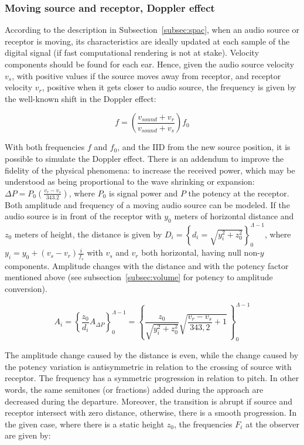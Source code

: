 \subsubsection{Moving source and receptor, Doppler effect}
According to the description in Subsection~\ref{subsec:spac}, when an audio source or receptor is moving, its characteristics are ideally updated at each sample of the digital signal (if fast computational rendering is not at stake). Velocity components should be found for each ear. Hence, given the audio source velocity $v_s$, with positive values if the source moves away from receptor, and receptor velocity $v_r$, positive when it gets closer to audio source, the frequency is given by the well-known shift in the Doppler effect:

\begin{equation}\label{eq:fDoppler}
    f=\left(\frac{v_{sound}+v_r}{v_{sound}+v_s}\right)f_0
\end{equation}

With both frequencies $f$ and $f_0$, and the IID from the new source
position, it is possible to simulate the Doppler effect. There is an addendum to improve the fidelity of the physical phenomena: to increase the received power, which may be understood as being proportional to the wave shrinking or expansion: $\Delta P=P_0\left(\frac{v_r-v_s}{343.2}\right)$,
 where $P_0$ is signal power and $P$ the potency at the receptor. Both amplitude and frequency of a moving audio source can be modeled. If the audio source is in front of the receptor with $y_0$ meters of horizontal distance and $z_0$ meters of height, the distance is given by
$D_i=\left\{ d_i=\sqrt{ y_{i}^{2}+z_{0}^{2} } \right\}_0^{\Lambda-1}$,
where $y_i=y_0+(v_s-v_r)\frac{i}{f_s}$ with $v_s$ and $v_r$ both
horizontal, having null non-$y$ components. Amplitude changes with the distance and with the potency factor mentioned above (see subsection~\ref{subsec:volume} for potency to amplitude conversion).

\begin{equation}\label{eq:aDoppler}
    A_i=\left\{ \frac{z_0}{d_i}A_{\Delta P}\right\}_0^{\Lambda-1} = \left\{ \frac{z_0}{\sqrt{y_i^2+z_0^2}} \sqrt{\frac{v_r-v_s}{343,2}+1}  \,\right\}_0^{\Lambda-1}
\end{equation}

The amplitude change caused by the distance is even, while the change caused by the potency variation is antisymmetric in
relation to the crossing of source with receptor. The frequency has a symmetric progression in relation to pitch. In other words, the same semitones (or fractions) added during the approach are decreased during the departure. Moreover, the transition is abrupt if source and receptor intersect with zero distance, otherwise, there is a smooth progression.
In the given case, where there is a static height $z_0$, the frequencies $F_i$ at the observer are given by:

